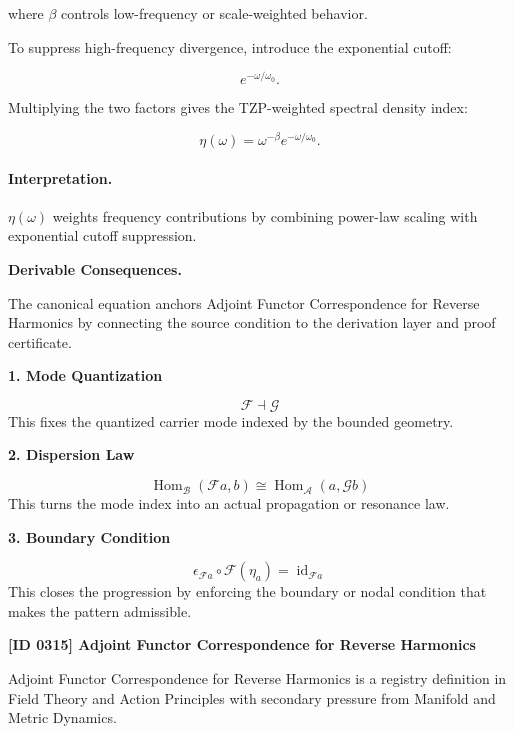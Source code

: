 where $\beta$ controls low-frequency or scale-weighted behavior.

To suppress high-frequency divergence, introduce the exponential cutoff:

\begin{equation}
e^{-\omega/\omega_0}.
\end{equation}

Multiplying the two factors gives the TZP-weighted spectral density index:

\begin{equation}
\boxed{
\eta(\omega)
=
\omega^{-\beta}
e^{-\omega/\omega_0}.
}
\end{equation}

\paragraph{Interpretation.}
$\eta(\omega)$ weights frequency contributions by combining power-law scaling with exponential cutoff suppression.

\par\vspace{0.35em}
\noindent\textbf{Derivable Consequences.}\quad
\begingroup
\footnotesize
\raggedright
The canonical equation anchors Adjoint Functor Correspondence for Reverse Harmonics by connecting the source condition to the derivation layer and proof certificate.
\par\endgroup

\noindent\textbf{1. Mode Quantization}\par
\[
\mathcal{F}\dashv\mathcal{G}
\]
\noindent This fixes the quantized carrier mode indexed by the bounded geometry.\par
\noindent\textbf{2. Dispersion Law}\par
\[
\operatorname{Hom}_{\mathcal{B}}(\mathcal{F}a,b)\cong\operatorname{Hom}_{\mathcal{A}}(a,\mathcal{G}b)
\]
\noindent This turns the mode index into an actual propagation or resonance law.\par
\noindent\textbf{3. Boundary Condition}\par
\[
\epsilon_{\mathcal{F}a}\circ\mathcal{F}(\eta_a)=\operatorname{id}_{\mathcal{F}a}
\]
\noindent This closes the progression by enforcing the boundary or nodal condition that makes the pattern admissible.\par

\clearpage
\noindent\textbf{[ID 0315] Adjoint Functor Correspondence for Reverse Harmonics}\par
\vspace{0.35em}
\begingroup\small
{}
Adjoint Functor Correspondence for Reverse Harmonics is a registry definition in Field Theory and Action Principles with secondary pressure from Manifold and Metric Dynamics.

